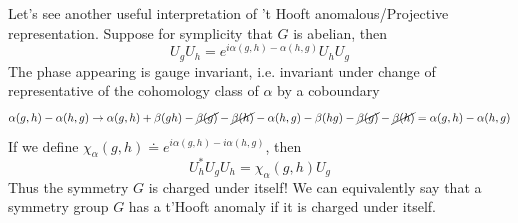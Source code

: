 \documentclass[11pt]{article}
\theoremstyle{definition}
\numberwithin{equation}{section}
\begin{document}
Let's see another useful interpretation of 't Hooft anomalous/Projective representation. Suppose for symplicity that $G$ is abelian, then
\begin{equation}
    U_g U_h = e^{i \alpha(g,h) - \alpha(h,g)} U_h U_g
\end{equation}
The phase appearing is gauge invariant, i.e. invariant under change of representative of the cohomology class of $\alpha$ by a coboundary
\begin{equation}
    \alpha(g,h) - \alpha(h,g) \to \alpha(g,h) + \beta(gh) - \cancel{\beta(g)} -\cancel{\beta(h)} - \alpha(h,g) - \beta(hg) -\cancel{\beta(g)} -\cancel{\beta(h)} =  \alpha(g,h) - \alpha(h,g)
\end{equation}
If we define $\chi_{\alpha}(g,h) \doteq e^{i \alpha(g,h) - i\alpha(h,g)}$, then
\begin{equation}
     U_h^* U_g U_h = \chi_{\alpha}(g,h) U_g
\end{equation}
Thus the symmetry $G$ is charged under itself! We can equivalently say that a symmetry group $G$ has a t'Hooft anomaly if it is charged under itself.

 
\end{document}
